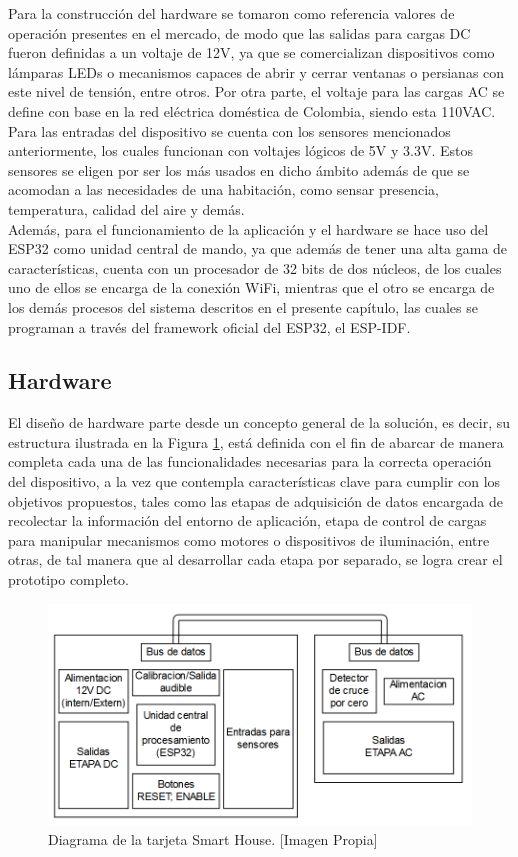 Para la construcción del hardware se tomaron como referencia valores de operación presentes en el mercado, de modo que las salidas para cargas DC fueron definidas a un voltaje de 12V, ya que se comercializan dispositivos como lámparas LEDs o mecanismos capaces de abrir y cerrar ventanas o persianas con este nivel de tensión, entre otros. Por otra parte, el voltaje para las cargas AC se define con base en la red eléctrica doméstica de Colombia, siendo esta 110VAC. Para las entradas del dispositivo se cuenta con los sensores mencionados anteriormente, los cuales funcionan con voltajes lógicos de 5V y 3.3V. Estos sensores se eligen por ser los más usados en dicho ámbito además de que se acomodan a las necesidades de una habitación, como sensar presencia, temperatura, calidad del aire y demás.\\

Además, para el funcionamiento de la aplicación y el hardware se hace uso del ESP32 como unidad central de mando, ya que además de tener una alta gama de características, cuenta con un procesador de 32 bits de dos núcleos, de los cuales uno de ellos se encarga de la conexión WiFi, mientras que el otro se encarga de los demás procesos del sistema descritos en el presente capítulo, las cuales se programan a través del framework oficial del ESP32, el ESP-IDF.

\subsection{Hardware}\label{sec:hw}

El diseño de hardware parte desde un concepto general de la solución, es decir, su estructura ilustrada en la Figura \ref{fig:tar}, está definida con el fin de abarcar de manera completa cada una de las funcionalidades necesarias para la correcta operación del dispositivo, a la vez que contempla características clave para cumplir con los objetivos propuestos, tales como las etapas de adquisición de datos encargada de recolectar la información del entorno de aplicación, etapa de control de cargas para manipular mecanismos como motores o dispositivos de iluminación, entre otras, de tal manera que al desarrollar cada etapa por separado, se logra crear el prototipo completo.\\

\begin{figure}[!t]
	\centering
	\caption[Diagrama de la tarjeta Smart House.]{Diagrama de la tarjeta Smart House.  [Imagen Propia]}
	\label{fig:tar}
	\includegraphics[width=0.7\linewidth]{Imagenes/Tarjeta}
\end{figure}

